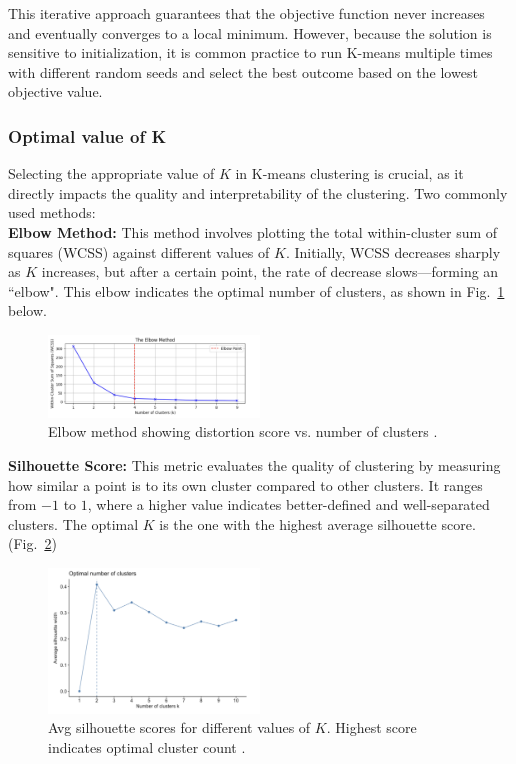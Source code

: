 \documentclass[conference]{IEEEtran}
\begin{document}
This iterative approach guarantees that the objective function never increases and eventually converges to a local minimum. However, because the solution is sensitive to initialization, it is common practice to run K-means multiple times with different random seeds and select the best outcome based on the lowest objective value. \\

\subsubsection{Optimal value of K}
Selecting the appropriate value of \( K \) in K-means clustering is crucial, as it directly impacts the quality and interpretability of the clustering. Two commonly used methods: \\

\textbf{Elbow Method:} This method involves plotting the total within-cluster sum of squares (WCSS) against different values of \( K \). Initially, WCSS decreases sharply as \( K \) increases, but after a certain point, the rate of decrease slows—forming an ``elbow". This elbow indicates the optimal number of clusters, as shown in Fig.~\ref{fig:elbow} below.

\begin{figure}[h]
    \centering
    \includegraphics[width=0.5\textwidth]{elbow_method.png}
    \caption{Elbow method showing distortion score vs. number of clusters \cite{geeksforgeeks_elbow}.}
    \label{fig:elbow}
\end{figure}

\textbf{Silhouette Score:} This metric evaluates the quality of clustering by measuring how similar a point is to its own cluster compared to other clusters. It ranges from \(-1\) to \(1\), where a higher value indicates better-defined and well-separated clusters. The optimal \( K \) is the one with the highest average silhouette score. (Fig.~\ref{fig:silhouette})

\begin{figure}[h]
    \centering
    \includegraphics[width=0.5\textwidth]{silhouette_example.png}
    \caption{Avg silhouette scores for different values of \( K \). Highest score indicates optimal cluster count \cite{uc_r_kmeans}.}
    \label{fig:silhouette}
\end{figure}
\end{document}
